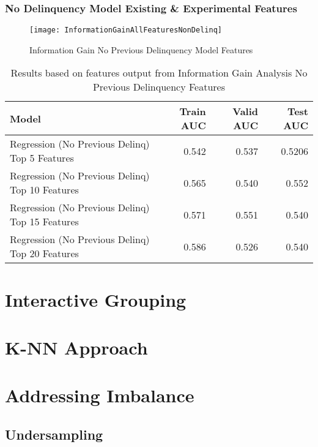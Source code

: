 \subsubsection{No Delinquency Model Existing \& Experimental Features}

\begin{figure}[H]
	\texttt{[image: InformationGainAllFeaturesNonDelinq]}
	\caption{Information Gain No Previous Delinquency Model Features}
	\label{fig:Information Gain No Previous Delinquency Model Features}
\end{figure}

\begin{table}[H]
	\centering
	\resizebox{\textwidth}{!}
	{
		\begin{tabular}{l | r | r| r}
			\hline
			\textbf{Model} & \textbf{Train AUC} & \textbf{Valid AUC} &  \textbf{Test AUC} \\
			\hline
			Regression (No Previous Delinq) Top 5 Features &  0.542 &  0.537 &  0.5206  \\
			Regression (No Previous Delinq) Top 10 Features &  0.565 &  0.540 &  0.552  \\			
			Regression (No Previous Delinq) Top 15 Features &  0.571 &  0.551 &  0.540  \\	
			Regression (No Previous Delinq) Top 20 Features &  0.586 &  0.526 &  0.540  \\		
						\hline
		\end{tabular}
	}
	\caption{Results based on features output from Information Gain Analysis No Previous Delinquency Features }
	\label{table:featureselection_base_model}
\end{table}

\section{Interactive Grouping}

\section{K-NN Approach}

\section{Addressing Imbalance}
\subsection{Undersampling}
